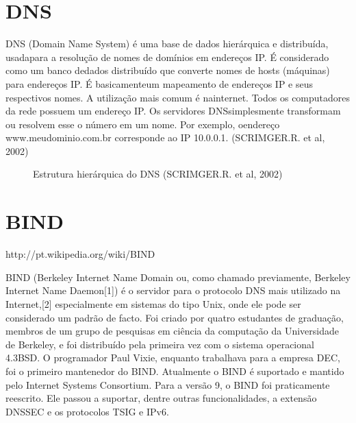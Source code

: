 \section{DNS}

DNS (Domain Name System) é uma base de dados hierárquica e distribuída, usadapara a resolução de nomes de domínios em endereços IP. É considerado como um banco dedados distribuído que converte nomes de hosts (máquinas) para endereços IP. É basicamenteum mapeamento de endereços IP e seus respectivos nomes. A utilização mais comum é nainternet. Todos os computadores da rede possuem um endereço IP. Os servidores DNSsimplesmente transformam ou resolvem esse o número em um nome. Por exemplo, oendereço www.meudominio.com.br corresponde ao IP 10.0.0.1. (SCRIMGER.R. et al, 2002)

\begin{figure}[ht]
   	\centering
   	\caption{Estrutura hierárquica do DNS (SCRIMGER.R. et al, 2002)}
    \label{dns}
\end{figure}


\section{BIND}

http://pt.wikipedia.org/wiki/BIND

BIND (Berkeley Internet Name Domain ou, como chamado previamente, Berkeley Internet Name Daemon[1]) é o servidor para o protocolo DNS mais utilizado na Internet,[2] especialmente em sistemas do tipo Unix, onde ele pode ser considerado um padrão de facto. Foi criado por quatro estudantes de graduação, membros de um grupo de pesquisas em ciência da computação da Universidade de Berkeley, e foi distribuído pela primeira vez com o sistema operacional 4.3BSD. O programador Paul Vixie, enquanto trabalhava para a empresa DEC, foi o primeiro mantenedor do BIND. Atualmente o BIND é suportado e mantido pelo Internet Systems Consortium.
Para a versão 9, o BIND foi praticamente reescrito. Ele passou a suportar, dentre outras funcionalidades, a extensão DNSSEC e os protocolos TSIG e IPv6.

